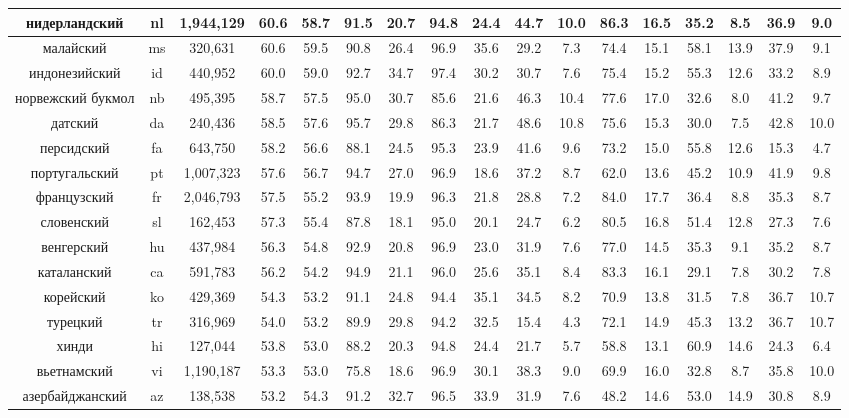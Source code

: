 \begin{table*}
{\begin{tabular}{|c|c|c||c|c|c|c|c|c|c|c|c|c|c|c|c|c|}
нидерландский & nl & 1,944,129 & 60.6 & 58.7 & 91.5 & 20.7 & 94.8 & 24.4 & 44.7 & 10.0 & 86.3 & 16.5 & 35.2 & 8.5 & 36.9 & 9.0\\ \hline
малайский & ms & 320,631 & 60.6 & 59.5 & 90.8 & 26.4 & 96.9 & 35.6 & 29.2 & 7.3 & 74.4 & 15.1 & 58.1 & 13.9 & 37.9 & 9.1\\ \hline
индонезийский & id & 440,952 & 60.0 & 59.0 & 92.7 & 34.7 & 97.4 & 30.2 & 30.7 & 7.6 & 75.4 & 15.2 & 55.3 & 12.6 & 33.2 & 8.9\\ \hline
норвежский букмол & nb & 495,395 & 58.7 & 57.5 & 95.0 & 30.7 & 85.6 & 21.6 & 46.3 & 10.4 & 77.6 & 17.0 & 32.6 & 8.0 & 41.2 & 9.7\\ \hline
датский & da & 240,436 & 58.5 & 57.6 & 95.7 & 29.8 & 86.3 & 21.7 & 48.6 & 10.8 & 75.6 & 15.3 & 30.0 & 7.5 & 42.8 & 10.0\\ \hline
персидский & fa & 643,750 & 58.2 & 56.6 & 88.1 & 24.5 & 95.3 & 23.9 & 41.6 & 9.6 & 73.2 & 15.0 & 55.8 & 12.6 & 15.3 & 4.7\\ \hline
португальский & pt & 1,007,323 & 57.6 & 56.7 & 94.7 & 27.0 & 96.9 & 18.6 & 37.2 & 8.7 & 62.0 & 13.6 & 45.2 & 10.9 & 41.9 & 9.8\\ \hline
французский & fr & 2,046,793 & 57.5 & 55.2 & 93.9 & 19.9 & 96.3 & 21.8 & 28.8 & 7.2 & 84.0 & 17.7 & 36.4 & 8.8 & 35.3 & 8.7\\ \hline
словенский & sl & 162,453 & 57.3 & 55.4 & 87.8 & 18.1 & 95.0 & 20.1 & 24.7 & 6.2 & 80.5 & 16.8 & 51.4 & 12.8 & 27.3 & 7.6\\ \hline
венгерский & hu & 437,984 & 56.3 & 54.8 & 92.9 & 20.8 & 96.9 & 23.0 & 31.9 & 7.6 & 77.0 & 14.5 & 35.3 & 9.1 & 35.2 & 8.7\\ \hline
каталанский & ca & 591,783 & 56.2 & 54.2 & 94.9 & 21.1 & 96.0 & 25.6 & 35.1 & 8.4 & 83.3 & 16.1 & 29.1 & 7.8 & 30.2 & 7.8\\ \hline
корейский & ko & 429,369 & 54.3 & 53.2 & 91.1 & 24.8 & 94.4 & 35.1 & 34.5 & 8.2 & 70.9 & 13.8 & 31.5 & 7.8 & 36.7 & 10.7\\ \hline
турецкий & tr & 316,969 & 54.0 & 53.2 & 89.9 & 29.8 & 94.2 & 32.5 & 15.4 & 4.3 & 72.1 & 14.9 & 45.3 & 13.2 & 36.7 & 10.7\\ \hline
хинди & hi & 127,044 & 53.8 & 53.0 & 88.2 & 20.3 & 94.8 & 24.4 & 21.7 & 5.7 & 58.8 & 13.1 & 60.9 & 14.6 & 24.3 & 6.4\\ \hline
вьетнамский & vi & 1,190,187 & 53.3 & 53.0 & 75.8 & 18.6 & 96.9 & 30.1 & 38.3 & 9.0 & 69.9 & 16.0 & 32.8 & 8.7 & 35.8 & 10.0\\ \hline
азербайджанский & az & 138,538 & 53.2 & 54.3 & 91.2 & 32.7 & 96.5 & 33.9 & 31.9 & 7.6 & 48.2 & 14.6 & 53.0 & 14.9 & 30.8 & 8.9\\ \hline

\end{tabular}}
\end{table*}
